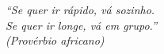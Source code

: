 \begin{epigrafe}
    \vspace*{\fill}
    \begin{flushright}
        \textit{``Se quer ir rápido, vá sozinho. \\
                  Se quer ir longe, vá em grupo.'' \\
                  (Provérbio africano)}
    \end{flushright}
\end{epigrafe}



